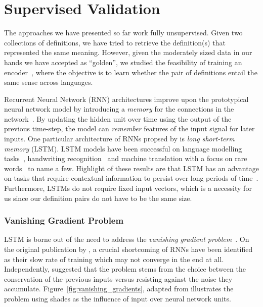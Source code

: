 
\chapter{Supervised Validation}%
\label{chap:supervised_validation}

The approaches we have presented so far work fully unsupervised.
Given two collections of definitions, we have tried to retrieve the definition(s) that represented the same meaning.
However, given the moderately sized data in our hands we have accepted as \enquote{golden}, we studied the feasibility of training an encoder~\cite{sutskever_sequence_2014}, where the objective is to learn whether the pair of definitions entail the same sense across languages.

Recurrent Neural Network (RNN) architectures improve upon the prototypical neural network model by introducing a \emph{memory} for the connections in the network~\cite{rumelhart_learning_1986}.
By updating the hidden unit over time using the output of the previous time-step, the model can \emph{remember} features of the input signal for later inputs.
One particular architecture of RNNs propsed by \textcite{hochreiter_long_1997} is \emph{long short-term memory} (LSTM).
LSTM models have been successful on language modelling tasks~\cite{sutskever_sequence_2014}, handwriting recognition~\cite{graves_unconstrained_2008,graves_novel_2009} and machine translation with a focus on rare words~\cite{luong_addressing_2014} to name a few.
Highlight of these results are that LSTM has an advantage on tasks that require contextual information to persist over long periods of time~\cite{graves_long_2012}.
Furthermore, LSTMs do not require fixed input vectors, which is a necessity for us since our definition pairs do not have to be the same size.

\subsection{Vanishing Gradient Problem}%
\label{sub:vanishing_gradient_problem}

LSTM is borne out of the need to address the \emph{vanishing gradient problem}~\cite{hochreiter_long_1997, bengio_learning_1994}.
On the original publication by \textcite{hochreiter_long_1997}, a crucial shortcoming of RNNs have been identified as their slow rate of training which may not converge in the end at all.
Independently, \textcite{bengio_learning_1994} suggested that the problem stems from the choice between the conservation of the previous inputs versus resisting against the noise they accumulate.
Figure~\ref{fig:vanishing_gradients}, adapted from \textcite{graves_long_2012} illustrates the problem using shades as the influence of input over neural network units.

